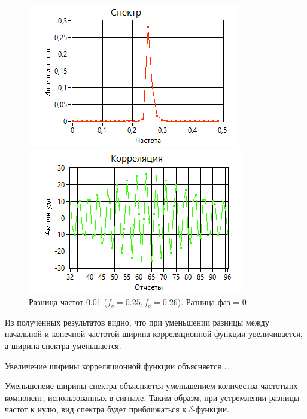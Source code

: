 \begin{figure}[h!]
    \centering
    \begin{minipage}{0.49\linewidth}
        \includegraphics[width =0.9\linewidth]{imgs/spec4.png}
    \end{minipage}
    \begin{minipage}{0.49\linewidth}
        \includegraphics[width =0.9\linewidth]{imgs/corr4.png}
    \end{minipage}
	\caption{Разница частот 0.01 ($f_{s}=0.25, f_{e}=0.26$). Разница фаз = 0}
	\label{fig:spec4}
\end{figure}

Из полученных результатов видно, что при уменьшении разницы между начальной
и конечной частотой ширина корреляционной функции увеличивается, а ширина спектра уменьшается.

Увеличение ширины корреляционной функции объясняется \dots

Уменьшенеие ширины спектра объясняется уменьшением количества частотынх компонент, использованных 
в сигнале. Таким образм, при устремлении разницы частот к нулю, вид спектра будет приближаться к $\delta$-функции.


